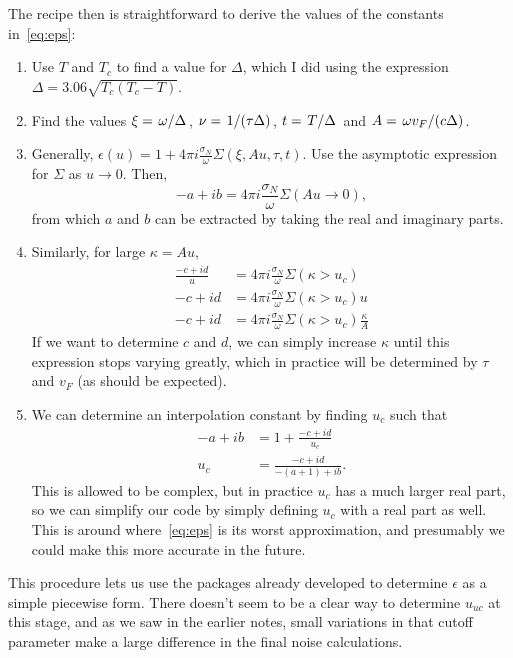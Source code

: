 \documentclass[11pt]{article}
\begin{document}
	The recipe then is straightforward to derive the values of the constants in~\eqref{eq:eps}:
	\begin{enumerate}
		\item Use $T$ and $T_c$ to find a value for $\Delta$, which I did using the expression $\Delta = 3.06 \sqrt{T_c(T_c - T)}$.
		\item Find the values $\xi = \flatfrac{\omega}{\Delta}$, $\nu = \flatfrac{1}{(\tau \Delta)}$,  $t = \flatfrac{T}{\Delta}$ and $A = \flatfrac{\omega v_F}{(c \Delta)}$.
		\item Generally, $\epsilon(u) = 1 + 4 \pi i \frac{\sigma_N}{\omega} \Sigma(\xi, A u, \tau, t)$.
			Use the asymptotic expression for $\Sigma$ as $u \rightarrow 0$.
			Then,
			\begin{equation}
				-a + ib = 4 \pi i \frac{\sigma_N}{\omega} \Sigma(A u \rightarrow 0),
			\end{equation}
			from which $a$ and $b$ can be extracted by taking the real and imaginary parts.
		\item Similarly, for large $\kappa = A u$,
			\begin{align}
				\frac{-c + i d}{u} &= 4 \pi i \frac{\sigma_N}{\omega} \Sigma(\kappa > u_c) \\
				- c + i d &= 4 \pi i \frac{\sigma_N}{\omega} \Sigma(\kappa > u_c) u \\
				- c + i d &= 4 \pi i \frac{\sigma_N}{\omega} \Sigma(\kappa > u_c) \frac{\kappa}{A}
			\end{align}
			If we want to determine $c$ and $d$, we can simply increase $\kappa$ until this expression stops varying greatly, which in practice will be determined by $\tau$ and $v_F$ (as should be expected).
		\item We can determine an interpolation constant by finding $u_c$ such that
			\begin{align}
				-a + ib &= 1 + \frac{-c + id}{u_c} \\
				u_c &= \frac{-c + id}{-(a + 1) + ib}.
			\end{align}
			This is allowed to be complex, but in practice $u_c$ has a much larger real part, so we can simplify our code by simply defining $u_c$ with a real part as well.
			This is around where~\eqref{eq:eps} is its worst approximation, and presumably we could make this more accurate in the future.
	\end{enumerate}

	This procedure lets us use the packages already developed to determine $\epsilon$ as a simple piecewise form.
	There doesn't seem to be a clear way to determine $u_{uc}$ at this stage, and as we saw in the earlier notes, small variations in that cutoff parameter make a large difference in the final noise calculations.


	\newpage
	\listoftodos
	\newpage
	\printbibliography
\end{document}
